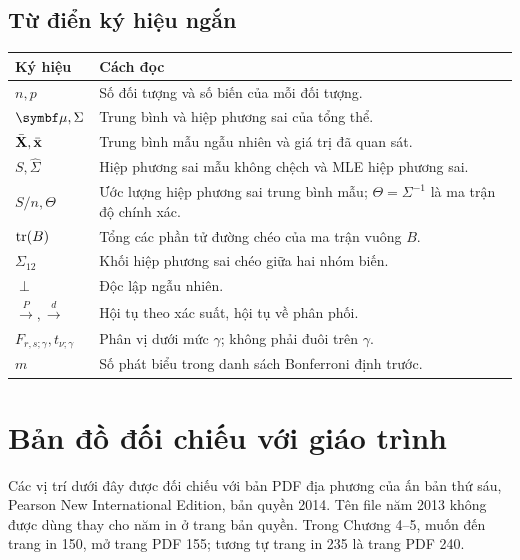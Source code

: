 \subsection{Từ điển ký hiệu ngắn}
\begin{center}
\begin{tabular}{lp{.70\linewidth}}
\toprule
Ký hiệu & Cách đọc\\
\midrule
$n,p$ & Số đối tượng và số biến của mỗi đối tượng.\\
$\vmu,\Sigma$ & Trung bình và hiệp phương sai của tổng thể.\\
$\bar{\mathbf X},\bar{\mathbf x}$ & Trung bình mẫu ngẫu nhiên và giá trị đã quan sát.\\
$S,\widehat\Sigma$ & Hiệp phương sai mẫu không chệch và MLE hiệp phương sai.\\
$S/n,\Theta$ & Ước lượng hiệp phương sai trung bình mẫu; $\Theta=\Sigma^{-1}$ là ma trận độ chính xác.\\
$\operatorname{tr}(B)$ & Tổng các phần tử đường chéo của ma trận vuông $B$.\\
$\Sigma_{12}$ & Khối hiệp phương sai chéo giữa hai nhóm biến.\\
$\perp$ & Độc lập ngẫu nhiên.\\
$\xrightarrow{P},\xrightarrow{d}$ & Hội tụ theo xác suất, hội tụ về phân phối.\\
$F_{r,s;\gamma},t_{\nu;\gamma}$ & Phân vị dưới mức $\gamma$; không phải đuôi trên $\gamma$.\\
$m$ & Số phát biểu trong danh sách Bonferroni định trước.\\
\bottomrule
\end{tabular}
\end{center}

\clearpage
\section{Bản đồ đối chiếu với giáo trình}
\label{sec:references}
Các vị trí dưới đây được đối chiếu với bản PDF địa phương của ấn bản thứ
sáu, Pearson New International Edition, bản quyền 2014.
Tên file năm 2013 không được dùng thay cho năm in ở trang bản quyền.
Trong Chương 4--5, muốn đến trang in 150, mở trang PDF 155; tương tự trang
in 235 là trang PDF 240.

